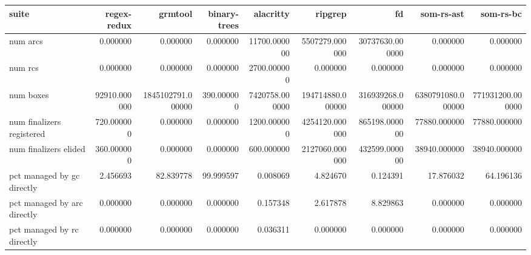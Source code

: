 \begin{tabular}{lrrrrrrrr}
\toprule
suite & regex-redux & grmtool & binary-trees & alacritty & ripgrep & fd & som-rs-ast & som-rs-bc \\
\midrule
num arcs & 0.000000 & 0.000000 & 0.000000 & 11700.000000 & 5507279.000000 & 30737630.000000 & 0.000000 & 0.000000 \\
num rcs & 0.000000 & 0.000000 & 0.000000 & 2700.000000 & 0.000000 & 0.000000 & 0.000000 & 0.000000 \\
num boxes & 92910.000000 & 1845102791.000000 & 390.000000 & 7420758.000000 & 194714880.000000 & 316939268.000000 & 6380791080.000000 & 771931200.000000 \\
num finalizers registered & 720.000000 & 0.000000 & 0.000000 & 1200.000000 & 4254120.000000 & 865198.000000 & 77880.000000 & 77880.000000 \\
num finalizers elided & 360.000000 & 0.000000 & 0.000000 & 600.000000 & 2127060.000000 & 432599.000000 & 38940.000000 & 38940.000000 \\
pct managed by gc directly & 2.456693 & 82.839778 & 99.999597 & 0.008069 & 4.824670 & 0.124391 & 17.876032 & 64.196136 \\
pct managed by arc directly & 0.000000 & 0.000000 & 0.000000 & 0.157348 & 2.617878 & 8.829863 & 0.000000 & 0.000000 \\
pct managed by rc directly & 0.000000 & 0.000000 & 0.000000 & 0.036311 & 0.000000 & 0.000000 & 0.000000 & 0.000000 \\
\bottomrule
\end{tabular}
